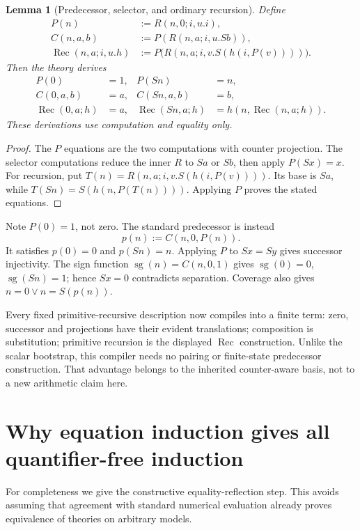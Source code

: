 \documentclass[11pt,letterpaper]{article}
\newtheorem{lemma}[theorem]{Lemma}
\theoremstyle{definition}
\newcommand{\Rec}{\mathop{\mathrm{Rec}}}
\newcommand{\sg}{\mathop{\mathrm{sg}}}
\begin{document}
\begin{lemma}[Predecessor, selector, and ordinary recursion]
Define
\begin{align*}
 P(n)&:=R(n,0;i,u.i),\\
 C(n,a,b)&:=P(R(n,a;i,u.Sb)),\\
 \Rec(n,a;i,u.h)&:=P\bigl(R(n,a;i,v.S(h(i,P(v))))\bigr).
\end{align*}
Then the theory derives
\begin{align*}
 P(0)&=1,&P(Sn)&=n,\\
 C(0,a,b)&=a,&C(Sn,a,b)&=b,\\
 \Rec(0,a;h)&=a,&\Rec(Sn,a;h)&=h(n,\Rec(n,a;h)).
\end{align*}
These derivations use computation and equality only.
\end{lemma}
\begin{proof}
The $P$ equations are the two computations with counter projection.
The selector computations reduce the inner $R$ to $Sa$ or $Sb$,
then apply $P(Sx)=x$. For recursion, put
$T(n)=R(n,a;i,v.S(h(i,P(v))))$. Its base is $Sa$, while
$T(Sn)=S(h(n,P(T(n))))$. Applying $P$ proves the stated equations.
\end{proof}

Note $P(0)=1$, not zero. The standard predecessor is instead
\[
                         p(n):=C(n,0,P(n)).
\]
It satisfies $p(0)=0$ and $p(Sn)=n$. Applying $P$ to $Sx=Sy$
gives successor injectivity. The sign function
$\sg(n)=C(n,0,1)$ gives $\sg(0)=0$, $\sg(Sn)=1$; hence
$Sx=0$ contradicts separation. Coverage also gives
$n=0\vee n=S(p(n))$.

Every fixed primitive-recursive description now compiles into a finite
term: zero, successor and projections have their evident translations;
composition is substitution; primitive recursion is the displayed
$\Rec$ construction. Unlike the scalar bootstrap, this compiler
needs no pairing or finite-state predecessor construction. That
advantage belongs to the inherited counter-aware basis, not to a
new arithmetic claim here.

\section{Why equation induction gives all quantifier-free induction}
\label{sec:reflection}

For completeness we give the constructive equality-reflection step.
This avoids assuming that agreement with standard numerical evaluation
already proves equivalence of theories on arbitrary models.
\end{document}
